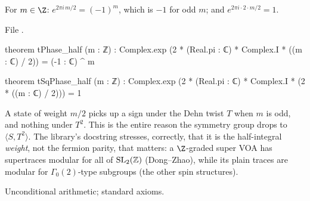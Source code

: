 \begin{theorem}\label{l14:thm:tphase}
For $m\in\Z$: $e^{2\pi i\,m/2} = (-1)^m$, which is $-1$ for odd $m$; and $e^{2\pi i\cdot2\cdot m/2} = 1$.
\end{theorem}
\noindent File .
\begin{leancode}
theorem tPhase_half (m : ℤ) :
    Complex.exp (2 * (Real.pi : ℂ) * Complex.I * ((m : ℂ) / 2)) = (-1 : ℂ) ^ m

theorem tSqPhase_half (m : ℤ) :
    Complex.exp (2 * (Real.pi : ℂ) * Complex.I * (2 * ((m : ℂ) / 2))) = 1
\end{leancode}
\begin{physics}
A state of weight $m/2$ picks up a sign under the Dehn twist $T$ when $m$ is odd, and nothing under $T^2$. This is the entire
reason the symmetry group drops to $\langle S,T^2\rangle$. The library's docstring stresses, correctly, that it is the
half-integral \emph{weight}, not the fermion parity, that matters: a $\Z$-graded super VOA has supertraces modular for all of
$\mathrm{SL}_2(\mathbb{Z})$ (Dong--Zhao), while its plain traces are modular for $\Gamma_0(2)$-type subgroups (the other spin structures).
\end{physics}
\begin{status}
Unconditional arithmetic; standard axioms.
\end{status}

